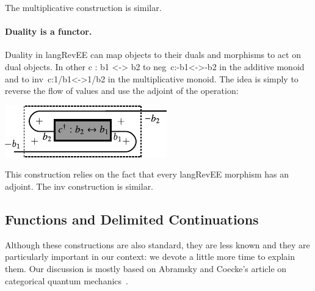 \documentclass[preprint]{sigplanconf}
\begin{document}
\noindent
The multiplicative construction is similar. 


\paragraph*{Duality is a functor.}
Duality in {{langRevEE}} can map objects to their duals and morphisms
to act on dual objects. In other {{c : b1 <-> b2}} to
{{neg~c:-b1<->-b2}} in the additive monoid and to
{{inv~c:1/b1<->1/b2}} in the multiplicative monoid. 
The idea is simply to reverse the flow of values and use the
adjoint of the operation:
\begin{multicols}{2}
\begin{center}
  \includegraphics{diagrams/neg_lift.pdf}
\end{center}  

\end{multicols}

This construction relies on the fact that every {{langRevEE}} morphism
has an adjoint.  The {{inv}} construction is similar.


\subsection{Functions and Delimited Continuations}
\label{sub:hof}

Although these constructions are also standard, they are less known and they
are particularly important in our context: we devote a little more time to
explain them. Our discussion is mostly based on Abramsky and Coecke's article
on categorical quantum mechanics~\cite{abramsky-2008}.
\end{document}
